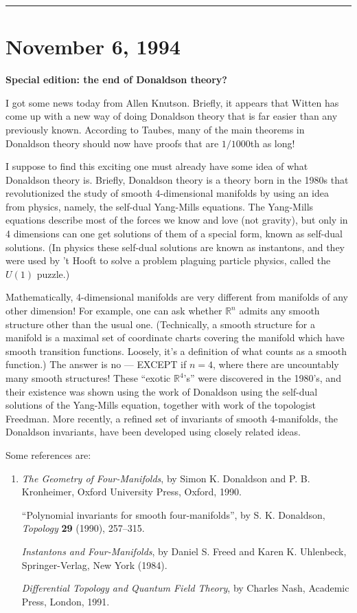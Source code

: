 \documentclass{article}
\begin{document}
\begin{center}\rule{0.5\linewidth}{0.5pt}\end{center}
\hypertarget{week44}{%
\section{November 6, 1994}\label{week44}}

\textbf{Special edition: the end of Donaldson theory?}

I got some news today from Allen Knutson. Briefly, it appears that
Witten has come up with a new way of doing Donaldson theory that is far
easier than any previously known. According to Taubes, many of the main
theorems in Donaldson theory should now have proofs that are
\(1/1000\)th as long!

I suppose to find this exciting one must already have some idea of what
Donaldson theory is. Briefly, Donaldson theory is a theory born in the
1980s that revolutionized the study of smooth 4-dimensional manifolds by
using an idea from physics, namely, the self-dual Yang-Mills equations.
The Yang-Mills equations describe most of the forces we know and love
(not gravity), but only in 4 dimensions can one get solutions of them of
a special form, known as self-dual solutions. (In physics these
self-dual solutions are known as instantons, and they were used by 't
Hooft to solve a problem plaguing particle physics, called the \(U(1)\)
puzzle.)

Mathematically, 4-dimensional manifolds are very different from
manifolds of any other dimension! For example, one can ask whether
\(\mathbb{R}^n\) admits any smooth structure other than the usual one.
(Technically, a smooth structure for a manifold is a maximal set of
coordinate charts covering the manifold which have smooth transition
functions. Loosely, it's a definition of what counts as a smooth
function.) The answer is no --- EXCEPT if \(n = 4\), where there are
uncountably many smooth structures! These ``exotic \(\mathbb{R}^4\)'s''
were discovered in the 1980's, and their existence was shown using the
work of Donaldson using the self-dual solutions of the Yang-Mills
equation, together with work of the topologist Freedman. More recently,
a refined set of invariants of smooth 4-manifolds, the Donaldson
invariants, have been developed using closely related ideas.

Some references are:

\begin{enumerate}
\def\labelenumi{\arabic{enumi})}
\item
  \emph{The Geometry of Four-Manifolds}, by Simon K. Donaldson and P. B.
  Kronheimer, Oxford University Press, Oxford, 1990.

  ``Polynomial invariants for smooth four-manifolds'', by S. K.
  Donaldson, \emph{Topology} \textbf{29} (1990), 257--315.

  \emph{Instantons and Four-Manifolds}, by Daniel S. Freed and Karen K.
  Uhlenbeck, Springer-Verlag, New York (1984).

  \emph{Differential Topology and Quantum Field Theory}, by Charles
  Nash, Academic Press, London, 1991.
\end{enumerate}
\end{document}

